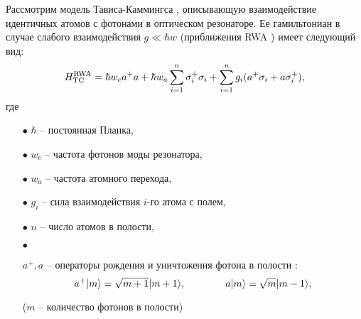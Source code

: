 Рассмотрим модель Тависа-Каммингса \cite{tc_exact_solution,tc_a_study,tc_dicke_2,tc_improvement,tc_experimental}, описывающую взаимодействие идентичных атомов с фотонами в оптическом резонаторе. Ее гамильтониан в случае слабого
взаимодействия $g \ll \hbar w$ (приближения RWA \cite{ozhigov_qq,rwa_rabi_1,rwa_rabi_2}) имеет следующий вид:
\begin{equation}
H_{\text{TC}}^{\text{RWA}} = \hbar w_{c}a^{+}a + \hbar w_{a} \sum_{i=1}^{n}\sigma_{i}^{+}\sigma_{i} + \sum_{i=1}^{n}g_{i}(a^{+}\sigma_{i} + a\sigma^{+}_{i}),
\end{equation}
где
\begin{itemize}
	\item[$\bullet$]{$\hbar$ -- постоянная Планка,}
	\item[$\bullet$]{$w_{c}$ -- частота фотонов моды резонатора,}
	\item[$\bullet$]{$w_{a}$ -- частота атомного перехода,}
	\item[$\bullet$]{$g_{i}$ -- сила взаимодействия $i$-го атома с полем,}
	\item[$\bullet$]{$n$ --  число атомов в полости,}
	\item[$\bullet$]{$a^{+}, a$ -- операторы рождения и уничтожения фотона в полости \cite{messia}:\\
		\begin{equation}
			a^{+}|m\rangle = \sqrt{m+1}|m+1\rangle,\qquad\qquad a|m\rangle = \sqrt{m}|m-1\rangle,
		\end{equation}
		\begin{center}($m$ -- количество фотонов в полости)\end{center}
		\
		
}
\end{itemize}
